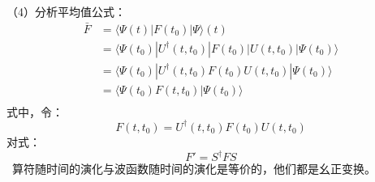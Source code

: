 \begin{frame}  
    \frametitle{} 
    （4）分析平均值公式：
    $$ \begin{aligned}
        \bar{F} &= \langle \Psi(t) |F(t_0) | \Psi \rangle(t)  \\
        &= \langle \Psi(t_0) |U^\dagger (t,t_0) |F(t_0) | U(t,t_0) |\Psi(t_0)\rangle   \\
        &= \langle \Psi(t_0) |U^\dagger (t,t_0) F(t_0) U(t,t_0) |\Psi(t_0)\rangle   \\
        &= \langle \Psi(t_0) F(t,t_0) |\Psi(t_0)\rangle   \\
    \end{aligned} $$
     式中，令： $$ F(t,t_0) =U^\dagger (t,t_0) F(t_0) U(t,t_0)$$
     对式：
     $$F'=S^\dagger F S $$
     \Note ~算符随时间的演化与波函数随时间的演化是等价的，他们都是幺正变换。
\end{frame} 

